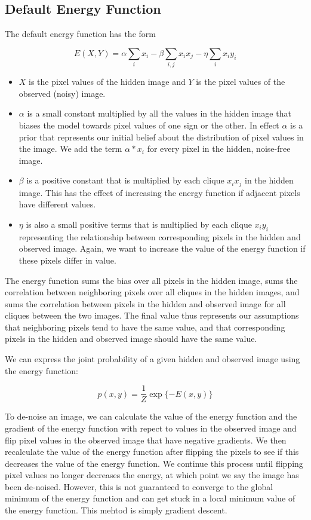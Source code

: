 \documentclass[11pt]{article}
\begin{document}
    \hypertarget{default-energy-function}{%
\subsection{Default Energy Function}\label{default-energy-function}}

The default energy function has the form

\[E(X,Y) = \alpha\sum\limits_{i} x_i - \beta \sum\limits_{i,j} x_i x_j - \eta \sum\limits_{i} x_i y_i \]

\begin{itemize}
\item
  \(X\) is the pixel values of the hidden image and \(Y\) is the pixel
  values of the observed (noisy) image.
\item
  \(\alpha\) is a small constant multiplied by all the values in the
  hidden image that biases the model towards pixel values of one sign or
  the other. In effect \(\alpha\) is a prior that represents our initial
  belief about the distribution of pixel values in the image. We add the
  term \(\alpha * x_i\) for every pixel in the hidden, noise-free image.
\item
  \(\beta\) is a positive constant that is multiplied by each clique
  \(x_i x_j\) in the hidden image. This has the effect of increasing the
  energy function if adjacent pixels have different values.
\item
  \(\eta\) is also a small positive terms that is multiplied by each
  clique \(x_i y_i\) representing the relationship between corresponding
  pixels in the hidden and observed image. Again, we want to increase
  the value of the energy function if these pixels differ in value.
\end{itemize}

The energy function sums the bias over all pixels in the hidden image,
sums the correlation between neighboring pixels over all cliques in the
hidden images, and sums the correlation between pixels in the hidden and
observed image for all cliques between the two images. The final value
thus represents our assumptions that neighboring pixels tend to have the
same value, and that corresponding pixels in the hidden and observed
image should have the same value.

We can express the joint probability of a given hidden and observed
image using the energy function:

\[p(x, y) = \frac{1}{Z} \exp\{-E(x,y)\}\]

To de-noise an image, we can calculate the value of the energy function
and the gradient of the energy function with repect to values in the
observed image and flip pixel values in the observed image that have
negative gradients. We then recalculate the value of the energy function
after flipping the pixels to see if this decreases the value of the
energy function. We continue this process until flipping pixel values no
longer decreases the energy, at which point we say the image has been
de-noised. However, this is not guaranteed to converge to the global
minimum of the energy function and can get stuck in a local minimum
value of the energy function. This mehtod is simply gradient descent.
\end{document}
